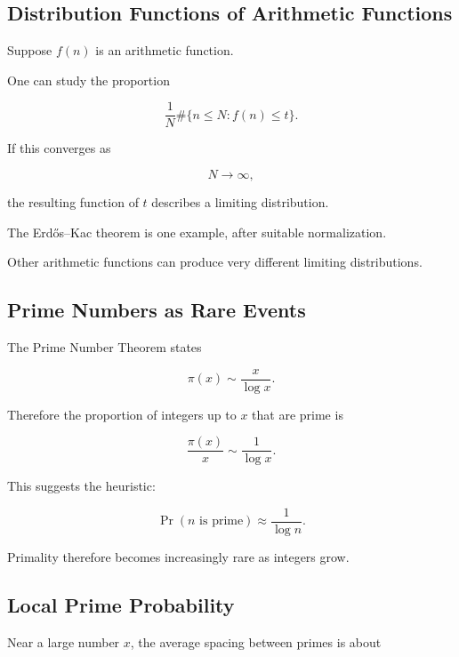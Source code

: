 \subsection{Distribution Functions of Arithmetic Functions}
\label{subsec:arithmetic-distribution-functions}

Suppose \(f(n)\) is an arithmetic function.

One can study the proportion

\[ \frac1N\#\{n\leq N:f(n)\leq t\}. \]

If this converges as

\[ N\to\infty, \]

the resulting function of \(t\) describes a limiting distribution.

The Erdős--Kac theorem is one example, after suitable normalization.

Other arithmetic functions can produce very different limiting
distributions.

\subsection{Prime Numbers as Rare Events}
\label{subsec:primes-as-rare-events}

The Prime Number Theorem states

\[ \pi(x)\sim\frac{x}{\log x}. \]

Therefore the proportion of integers up to \(x\) that are prime is

\[ \frac{\pi(x)}x\sim\frac1{\log x}. \]

This suggests the heuristic:

\[ \boxed{\Pr(n\text{ is prime})\approx\frac1{\log n}.} \]

Primality therefore becomes increasingly rare as integers grow.

\subsection{Local Prime Probability}
\label{subsec:local-prime-probability}

Near a large number \(x\), the average spacing between primes is about

